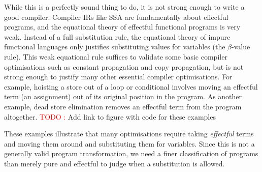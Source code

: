 \documentclass[acmsmall,screen,review]{acmart}
\newcounter{todos}
\newcommand{\todo}[1]{\stepcounter{todos} \textcolor{red}{TODO \arabic{todos}:} #1}
\begin{document}
While this is a perfectly sound thing to do, it is not strong enough to write a
good compiler. Compiler IRs like SSA are fundamentally about effectful programs,
and the equational theory of effectful functional programs is very weak. Instead
of a full substitution rule, the equational theory of impure functional
languages only justifies substituting values for variables (the $\beta$-value
rule). This weak equational rule suffices to validate some basic compiler
optimisations such as constant propagation and copy propagation, but is not
strong enough to justify many other essential compiler optimisations. For
example, hoisting a store out of a loop or conditional involves moving an
effectful term (an assignment) out of its original position in the program. As
another example, dead store elimination removes an effectful term from the
program altogether. \todo{Add link to figure with code for these examples}

These examples illustrate that many optimisations require taking
\emph{effectful} terms and moving them around and substituting them for
variables. Since this is not a generally valid program transformation, we need a
finer classification of programs than merely pure and effectful to judge when a
substitution is allowed.
\end{document}
